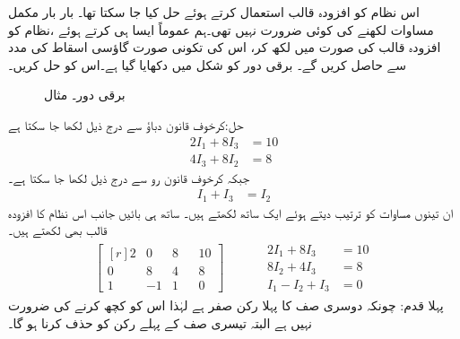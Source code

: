 اس نظام کو افزودہ قالب استعمال کرتے ہوئے حل کیا جا سکتا تھا۔ بار بار مکمل مساوات لکھنے کی کوئی ضرورت نہیں تھی۔ہم عموماً ایسا ہی کرتے ہوئے ،نظام کو افزودہ قالب کی صورت میں لکھ کر، اس کی تکونی صورت گاؤسی اسقاط کی مدد سے حاصل کریں گے۔  
برقی دور کو شکل  میں دکھایا گیا ہے۔اس کو حل کریں۔
\begin{figure}
\centering
{}
\caption{برقی دور۔ مثال }
\label{شکل_مثال_الجبرا_دور_گاوسی_اسقاط}
\end{figure}
حل:کرخوف قانون دباؤ سے درج ذیل لکھا جا سکتا ہے
\begin{align*}
2I_1+8I_3&=10\\
4I_3+8I_2&=8
\end{align*}
جبکہ کرخوف قانون رو سے درج ذیل لکھا جا سکتا ہے۔
\begin{align*}
I_1+I_3&=I_2
\end{align*}
ان تینوں مساوات کو ترتیب دیتے ہوئے ایک ساتھ لکھتے ہیں۔ ساتھ ہی بائیں جانب اس نظام کا افزودہ قالب بھی لکھتے ہیں۔
\begin{gather*}
\begin{bmatrix*}[r]2&0&8&&10\\0&8&4&&8\\
1&-1&1&&0  \end{bmatrix*}\quad \quad \quad 
\begin{aligned}
2I_1+8I_3&=10\\
8I_2+4I_3&=8\\
I_1-I_2+I_3&=0
\end{aligned}
\end{gather*}
پہلا قدم: چونکہ دوسری صف کا پہلا رکن صفر ہے لہٰذا اس کو کچھ کرنے کی ضرورت نہیں ہے البتہ تیسری  صف کے پہلے رکن  کو حذف کرنا ہو گا۔

